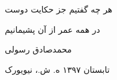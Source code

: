 {	\begin{center}
		هر چه گفتیم جز حکایت دوست
		
		در همه عمر از آن پشیمانیم
	\end{center}
	\begin{flushleft}
		{
			محمدصادق رسولی
			
			تابستان ۱۳۹۷ ه. ش.،	نیویورک
		}
	\end{flushleft}
	
}











